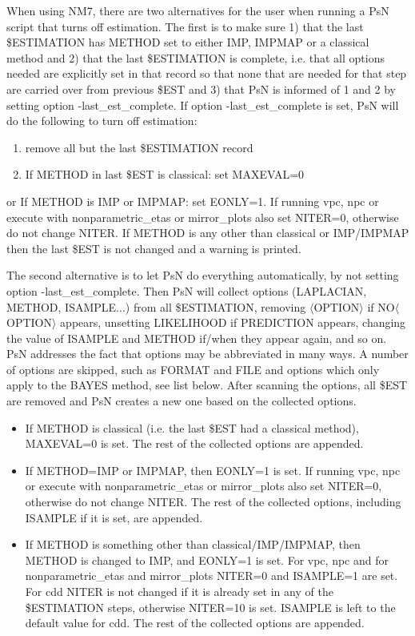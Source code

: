 \documentclass[a4paper,12pt]{article}
\begin{document}
When using NM7, there are two alternatives for the user when running a PsN script that turns off estimation. The first is to make sure 1) that the last \$ESTIMATION has METHOD set to either IMP, IMPMAP or a classical method and 2) that the last \$ESTIMATION is complete, i.e. that all options needed are explicitly set in that record so that none that are needed for that step are carried over from previous \$EST and 3) that PsN is informed of 1 and 2 by setting option -last\_est\_complete. If option -last\_est\_complete is set, PsN will do the following to turn off estimation: 
\begin{enumerate}
	\item remove all but the last \$ESTIMATION record 
	\item If METHOD in last \$EST is classical: set MAXEVAL=0 
\end{enumerate}
or 
If METHOD is IMP or IMPMAP: set EONLY=1. If running vpc, npc or execute with nonparametric\_etas or mirror\_plots also set NITER=0, otherwise do not change NITER.
If METHOD is any other than classical or IMP/IMPMAP then the last \$EST is not changed and a warning is printed.

The second alternative is to let PsN do everything automatically, by not setting option -last\_est\_complete. Then PsN will collect options (LAPLACIAN, METHOD, ISAMPLE...) from all \$ESTIMATION, removing $\langle$OPTION$\rangle$ if NO$\langle$OPTION$\rangle$ appears, unsetting LIKELIHOOD if PREDICTION appears, changing the value of ISAMPLE and METHOD if/when they appear again, and so on. PsN addresses the fact that options may be abbreviated in many ways. A number of options are skipped, such as FORMAT and FILE and options which only apply to the BAYES method, see list below. After scanning the options, all \$EST are removed and PsN creates a new one based on the collected options. 

\begin{itemize}
	\item If METHOD is classical (i.e. the last \$EST had a classical method), MAXEVAL=0 is set. The rest of the collected options are appended.
	\item If METHOD=IMP or IMPMAP, then EONLY=1 is set. If running vpc, npc or execute with nonparametric\_etas or mirror\_plots also set NITER=0, otherwise do not change NITER. The rest of the collected options, including ISAMPLE if it is set, are appended. 
	\item If METHOD is something other than classical/IMP/IMPMAP, then METHOD is changed to IMP, and EONLY=1 is set. For vpc, npc and for nonparametric\_etas and mirror\_plots NITER=0 and ISAMPLE=1 are set. For cdd NITER is not changed if it is already set in any of the \$ESTIMATION steps, otherwise NITER=10 is set. ISAMPLE is left to the default value for cdd. The rest of the collected options are appended.
\end{itemize}
\end{document}
